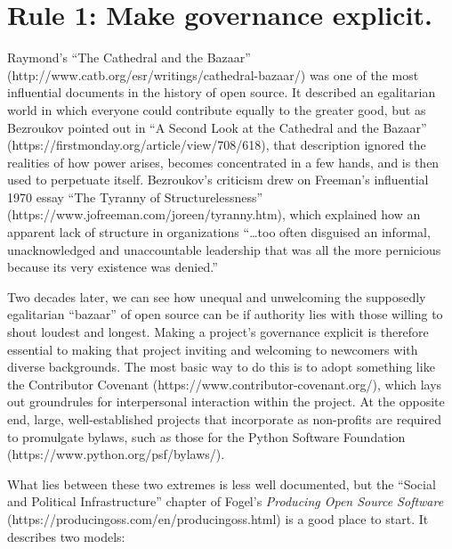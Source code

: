 \documentclass[10pt,letterpaper]{article}
\newcommand{\rulemajor}[1]{\section{#1}}
\begin{document}
\rulemajor{Rule 1: Make governance explicit.}

Raymond's ``The Cathedral and the Bazaar'' (http://www.catb.org/esr/writings/cathedral-bazaar/)
was one of the most influential documents in the history of open source.
It described an egalitarian world in which everyone could contribute equally to the greater good,
but as Bezroukov pointed out in ``A Second Look at the Cathedral and the Bazaar'' (https://firstmonday.org/article/view/708/618),
that description ignored the realities of how power arises,
becomes concentrated in a few hands,
and is then used to perpetuate itself.
Bezroukov's criticism drew on Freeman's influential 1970 essay ``The Tyranny of Structurelessness'' (https://www.jofreeman.com/joreen/tyranny.htm),
which explained how an apparent lack of structure in organizations ``{\ldots}too often disguised an informal,
unacknowledged and unaccountable leadership that was all the more pernicious because its very existence was denied.''

Two decades later,
we can see how unequal and unwelcoming the supposedly egalitarian ``bazaar'' of open source can be
if authority lies with those willing to shout loudest and longest.
Making a project's governance explicit is therefore essential to making that project inviting and welcoming to newcomers with diverse backgrounds.
The most basic way to do this is to adopt something like the Contributor Covenant (https://www.contributor-covenant.org/),
which lays out groundrules for interpersonal interaction within the project.
At the opposite end,
large, well-established projects that incorporate as non-profits are required to promulgate bylaws,
such as those for the Python Software Foundation (https://www.python.org/psf/bylaws/).

What lies between these two extremes is less well documented,
but the ``Social and Political Infrastructure'' chapter of Fogel's \emph{Producing Open Source Software} (https://producingoss.com/en/producingoss.html)
is a good place to start.
It describes two models:
\end{document}
